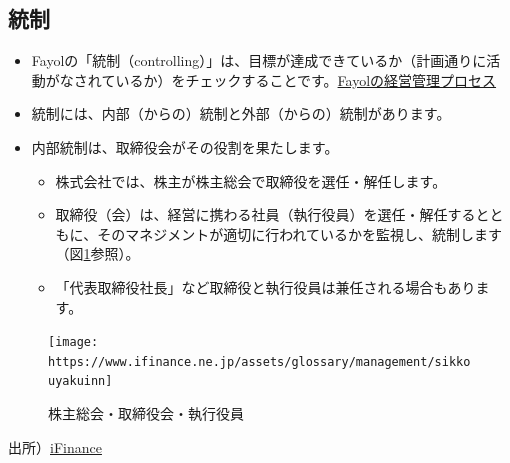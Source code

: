 \documentclass[
]{book}
\begin{document}
\hypertarget{us-control}{%
\subsection{統制}\label{us-control}}

\begin{itemize}
\item
  Fayolの「統制（controlling）」は、目標が達成できているか（計画通りに活動がなされているか）をチェックすることです。\protect\hyperlink{fayol}{Fayolの経営管理プロセス}
\item
  統制には、内部（からの）統制と外部（からの）統制があります。
\item
  内部統制は、取締役会がその役割を果たします。

  \begin{itemize}
  \item
    株式会社では、株主が株主総会で取締役を選任・解任します。
  \item
    取締役（会）は、経営に携わる社員（執行役員）を選任・解任するとともに、そのマネジメントが適切に行われているかを監視し、統制します（図\ref{fig:executive}参照）。
  \item
    「代表取締役社長」など取締役と執行役員は兼任される場合もあります。
  \end{itemize}
\end{itemize}

\begin{figure}
\texttt{[image: https://www.ifinance.ne.jp/assets/glossary/management/sikkouyakuinn]} \caption{株主総会・取締役会・執行役員}\label{fig:executive}
\end{figure}

出所）\href{https://www.ifinance.ne.jp/glossary/management/man129.html}{iFinance}
\end{document}
